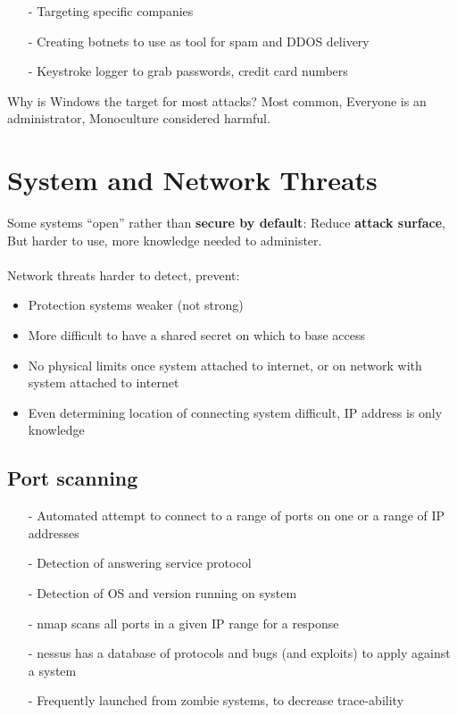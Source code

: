 \begin{itemize}
    \item[-] Targeting specific companies
    \item[-] Creating botnets to use as tool for spam and DDOS delivery
    \item[-] Keystroke logger to grab passwords, credit card numbers
\end{itemize}

Why is Windows the target for most attacks? Most common, Everyone is an administrator, Monoculture considered harmful.

\newpage
\section{System and Network Threats}

Some systems “open” rather than \textbf{secure by default}: Reduce\textbf{ attack surface}, But harder to use, more knowledge needed to administer.

\paragraph{}
Network threats harder to detect, prevent:


\begin{itemize}
    \item Protection systems weaker (not strong)
    \item More difficult to have a shared secret on which to base access
    \item No physical limits once system attached to internet, or on network with system attached to internet
    \item Even determining location of connecting system difficult, IP address is only knowledge
\end{itemize}

\subsection{Port scanning}




\begin{itemize}
    \item[-] Automated attempt to connect to a range of ports on one or a range of IP addresses
    \item[-] Detection of answering service protocol
    \item[-] Detection of OS and version running on system
    \item[-] nmap scans all ports in a given IP range for a response
    \item[-] nessus has a database of protocols and bugs (and exploits) to apply against a system
    \item[-] Frequently launched from zombie systems, to decrease trace-ability
\end{itemize}

